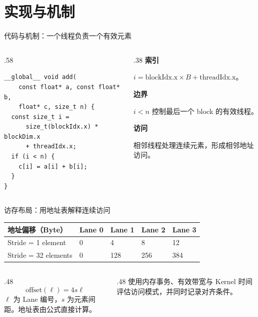 \section{实现与机制}

\begin{frame}[fragile]{代码与机制：一个线程负责一个有效元素}
\begin{columns}[T,onlytextwidth]
\begin{column}{.58\textwidth}
\begin{lstlisting}[basicstyle=\small\ttfamily,aboveskip=2pt,belowskip=2pt]
__global__ void add(
    const float* a, const float* b,
    float* c, size_t n) {
  const size_t i =
      size_t(blockIdx.x) * blockDim.x
      + threadIdx.x;
  if (i < n) {
    c[i] = a[i] + b[i];
  }
}
\end{lstlisting}
\end{column}
\begin{column}{.38\textwidth}
\textbf{索引}\par $i=\mathrm{blockIdx.x}\times B+\mathrm{threadIdx.x}$。
\par\vspace{0.2mm}\textbf{边界}\par $i<n$ 控制最后一个 block 的有效线程。
\par\vspace{0.2mm}\textbf{访问}\par 相邻线程处理连续元素，形成相邻地址访问。
\end{column}
\end{columns}
\end{frame}

\begin{frame}{访存布局：用地址表解释连续访问}
\begin{tabularx}{\textwidth}{@{}p{3.4cm}XXXX@{}}
\toprule 地址偏移（Byte） & Lane 0 & Lane 1 & Lane 2 & Lane 3 \\\midrule
Stride = 1 element & 0 & 4 & 8 & 12 \\
Stride = 32 elements & 0 & 128 & 256 & 384 \\
\bottomrule
\end{tabularx}
\vspace{5mm}
\begin{columns}[T,onlytextwidth]
\begin{column}{.48\textwidth}
\[\mathrm{offset}(\ell)=4s\ell\]
\smalltext $\ell$ 为 Lane 编号，$s$ 为元素间距。地址表由公式直接计算。
\end{column}
\begin{column}{.48\textwidth}
使用内存事务、有效带宽与 Kernel 时间评估访问模式，并同时记录对齐条件。
\end{column}
\end{columns}
\end{frame}

